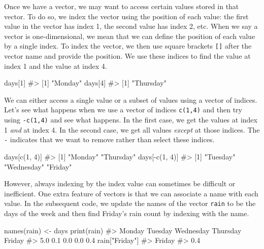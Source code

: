 \documentclass[
  letterpaper,
]{latex/krantz}
\makeatletter
\newenvironment{Shaded}{\begin{snugshade}}{\end{snugshade}}
\newcommand{\CommentTok}[1]{\textcolor[rgb]{0.37,0.37,0.37}{#1}}
\newcommand{\DecValTok}[1]{\textcolor[rgb]{0.68,0.00,0.00}{#1}}
\newcommand{\FunctionTok}[1]{\textcolor[rgb]{0.28,0.35,0.67}{#1}}
\newcommand{\NormalTok}[1]{\textcolor[rgb]{0.00,0.23,0.31}{#1}}
\newcommand{\OtherTok}[1]{\textcolor[rgb]{0.00,0.23,0.31}{#1}}
\newcommand{\SpecialCharTok}[1]{\textcolor[rgb]{0.37,0.37,0.37}{#1}}
\newcommand{\StringTok}[1]{\textcolor[rgb]{0.13,0.47,0.30}{#1}}
\newenvironment{kframe}{%
\medskip{}
\setlength{\fboxsep}{.8em}
 \def\at@end@of@kframe{}%
 \ifinner\ifhmode%
  \def\at@end@of@kframe{\end{minipage}}%
  \begin{minipage}{\columnwidth}%
 \fi\fi%
 \def\FrameCommand##1{\hskip\@totalleftmargin \hskip-\fboxsep
 \colorbox{shadecolor}{##1}\hskip-\fboxsep
     \hskip-\linewidth \hskip-\@totalleftmargin \hskip\columnwidth}%
 \MakeFramed {\advance\hsize-\width
   \@totalleftmargin\z@ \linewidth\hsize
   \@setminipage}}%
 {\par\unskip\endMakeFramed%
 \at@end@of@kframe}
\renewenvironment{Shaded}{\begin{kframe}}{\end{kframe}}
\makeatother
\begin{document}
Once we have a vector, we may want to access certain values stored in
that vector. To do so, we index the vector using the position of each
value: the first value in the vector has index 1, the second value has
index 2, etc. When we say a vector is one-dimensional, we mean that we
can define the position of each value by a single index. To index the
vector, we then use square brackets \texttt{{[}{]}} after the vector
name and provide the position. We use these indices to find the value at
index 1 and the value at index 4.

\begin{Shaded}
\begin{Highlighting}[]
\NormalTok{days[}\DecValTok{1}\NormalTok{]}
\CommentTok{\#\textgreater{} [1] "Monday"}
\NormalTok{days[}\DecValTok{4}\NormalTok{]}
\CommentTok{\#\textgreater{} [1] "Thursday"}
\end{Highlighting}
\end{Shaded}

We can either access a single value or a subset of values using a vector
of indices. Let's see what happens when we use a vector of indices
\texttt{c(1,4)} and then try using \texttt{-c(1,4)} and see what
happens. In the first case, we get the values at index 1 \emph{and} at
index 4. In the second case, we get all values \emph{except} at those
indices. The \texttt{-} indicates that we want to remove rather than
select these indices.

\begin{Shaded}
\begin{Highlighting}[]
\NormalTok{days[}\FunctionTok{c}\NormalTok{(}\DecValTok{1}\NormalTok{, }\DecValTok{4}\NormalTok{)]}
\CommentTok{\#\textgreater{} [1] "Monday"   "Thursday"}
\NormalTok{days[}\SpecialCharTok{{-}}\FunctionTok{c}\NormalTok{(}\DecValTok{1}\NormalTok{, }\DecValTok{4}\NormalTok{)]}
\CommentTok{\#\textgreater{} [1] "Tuesday"   "Wednesday" "Friday"}
\end{Highlighting}
\end{Shaded}

However, always indexing by the index value can sometimes be difficult
or inefficient. One extra feature of vectors is that we can associate a
name with each value. In the subsequent code, we
update the names of the vector \texttt{rain} to be the days of the week
and then find Friday's rain count by indexing with the name.

\begin{Shaded}
\begin{Highlighting}[]
\FunctionTok{names}\NormalTok{(rain) }\OtherTok{\textless{}{-}}\NormalTok{ days}
\FunctionTok{print}\NormalTok{(rain)}
\CommentTok{\#\textgreater{}    Monday   Tuesday Wednesday  Thursday    Friday }
\CommentTok{\#\textgreater{}       5.0       0.1       0.0       0.0       0.4}
\NormalTok{rain[}\StringTok{"Friday"}\NormalTok{]}
\CommentTok{\#\textgreater{} Friday }
\CommentTok{\#\textgreater{}    0.4}
\end{Highlighting}
\end{Shaded}
\end{document}
